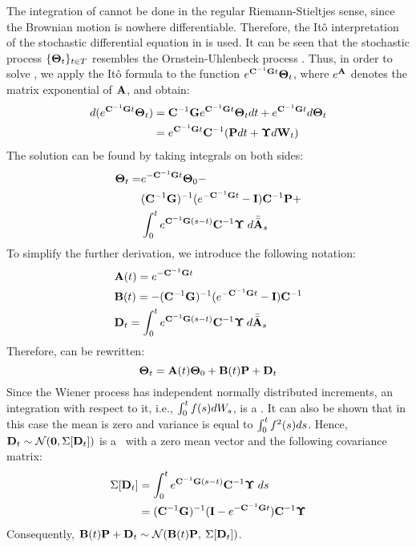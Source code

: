 The integration of  cannot be done in the regular Riemann-Stieltjes sense, since the Brownian motion is nowhere differentiable. Therefore, the It\^{o} interpretation \cite{oksendal2003} of the stochastic differential equation in  is used. It can be seen that the stochastic process $\{ \mathbf{\Theta}_t \}_{t \in T}$ resembles the Ornstein-Uhlenbeck process \cite{kloeden1992}. Thus, in order to solve , we apply the It\^{o} formula \cite{oksendal2003} to the function $e^{ \mathbf{C}^{-1} \mathbf{G} t} \mathbf{\Theta}_t$, where $e^{\mathbf{A}}$ denotes the matrix exponential of $\mathbf{A}$, and obtain:
\begin{align*}
  d(e^{\mathbf{C}^{-1} \mathbf{G} t} \mathbf{\Theta}_t) & = \mathbf{C}^{-1} \mathbf{G} e^{\mathbf{C}^{-1} \mathbf{G} t} \mathbf{\Theta}_t dt + e^{\mathbf{C}^{-1} \mathbf{G} t} d\mathbf{\Theta}_t \\
  & = e^{\mathbf{C}^{-1} \mathbf{G} t} \mathbf{C}^{-1} (\mathbf{P} dt + \mathbf{\Upsilon} d\mathbf{W}_t)
\end{align*}
The solution can be found by taking integrals on both sides:
\begin{align} \equlabel{solution-full}
  \vtemperature_\time = & \emcgt \vtemperature_0 - \\
    & (\cg)^{-1}(\emcgt - \mone) \mcapacitance^{-1} \vpower + \nonumber \\
    & \int_0^\time \ecg{}{(s - \time)} \mcapacitance^{-1} \mnoisedeviation \; d\atwo_s \nonumber
\end{align}
To simplify the further derivation, we introduce the following notation:
\begin{align}
  & \m{A}(\time) = \emcg{\time} \equlabel{a} \\
  & \m{B}(\time) = -(\cg)^{-1}(\emcg{\time} - \mone) \mcapacitance^{-1} \equlabel{b} \\
  & \v{D}_\time = \int_0^{\time} \ecg{}{(s - \time)} \mcapacitance^{-1} \mnoisedeviation \: d\atwo_s \equlabel{d}
\end{align}
Therefore,  can be rewritten:
\[
  \mathbf{\Theta}_t = \mathbf{A}(t) \mathbf{\Theta}_0 + \mathbf{B}(t) \mathbf{P} + \mathbf{D}_t
\]
Since the Wiener process has independent normally distributed increments, an integration with respect to it, i.e., $\int_0^t f(s) dW_s$, is a \nrv. It can also be shown that in this case the mean is zero and variance is equal to $\int_0^t f^2(s) ds$. Hence, $\mathbf{D}_t \sim \mathcal{N}(\mathbf{0}, \Sigma[\mathbf{D}_t])$ is a \mnrv\ with a zero mean vector and the following covariance matrix:
\begin{align}
  \covariance{\v{D}_\time} & = \int_0^\time \ecg{}{(s - \time)} \mcapacitance^{-1} \mnoisedeviation \; ds \nonumber \\
    & = (\cg)^{-1} (\mone - \emcgt) \mcapacitance^{-1} \mnoisedeviation \equlabel{covariance-d}
\end{align}
Consequently, $\mathbf{B}(t) \mathbf{P} + \mathbf{D}_t \sim \mathcal{N}(\mathbf{B}(t) \mathbf{P}, \: \Sigma[\mathbf{D}_t])$.

